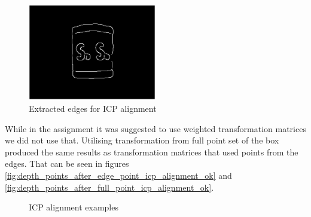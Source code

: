 \documentclass{article}
\begin{document}
\begin{figure}[h!]
  \centering
  \includegraphics[width=0.5\textwidth]{figs/extracted_edge_mask}
  \caption{Extracted edges for ICP alignment}
  \label{fig:extracted_edge_mask}
\end{figure}

While in the assignment it was suggested to use
weighted transformation matrices we did not use that.
Utilising transformation from full point set of 
the box produced the same results as
transformation matrices that used points from 
the edges. That can be seen in figures 
\ref{fig:depth_points_after_edge_point_icp_alignment_ok}
and
\ref{fig:depth_points_after_full_point_icp_alignment_ok}.

\begin{figure}[h!]
    \centering
      \quad
      \caption{ICP alignment examples}
\end{figure}
\end{document}
